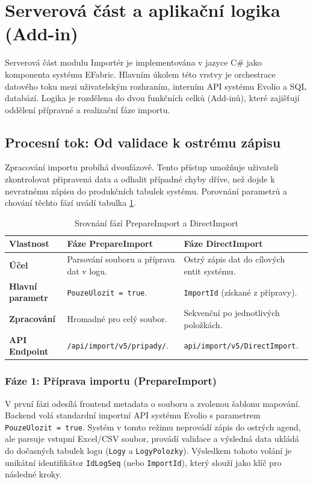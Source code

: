 \section{Serverová část a aplikační logika (Add-in)}

Serverová část modulu Importér je implementována v jazyce C\# jako komponenta systému EFabric. Hlavním úkolem této vrstvy je orchestrace datového toku mezi uživatelským rozhraním, interním API systému Evolio a SQL databází. Logika je rozdělena do dvou funkčních celků (Add-inů), které zajišťují oddělení přípravné a realizační fáze importu.

\subsection{Procesní tok: Od validace k ostrému zápisu}

Zpracování importu probíhá dvoufázově. Tento přístup umožňuje uživateli zkontrolovat připravená data a odhalit případné chyby dříve, než dojde k nevratnému zápisu do produkčních tabulek systému. Porovnání parametrů a chování těchto fází uvádí tabulka \ref{tab:be_comparison}.

\begin{table}[H]
\centering
\caption{Srovnání fází PrepareImport a DirectImport}
\label{tab:be_comparison}
\begin{tabular}{|l|p{5.5cm}|p{5.5cm}|}
\hline
\textbf{Vlastnost} & \textbf{Fáze PrepareImport} & \textbf{Fáze DirectImport} \\ \hline
\textbf{Účel} & Parsování souboru a příprava dat v logu. & Ostrý zápis dat do cílových entit systému. \\ \hline
\textbf{Hlavní parametr} & \texttt{PouzeUlozit = true}. & \texttt{ImportId} (získané z přípravy). \\ \hline
\textbf{Zpracování} & Hromadné pro celý soubor. & Sekvenční po jednotlivých položkách. \\ \hline
\textbf{API Endpoint} & \texttt{/api/import/v5/pripady/}. & \texttt{api/import/v5/DirectImport}. \\ \hline
\end{tabular}
\end{table}

\subsubsection{Fáze 1: Příprava importu (PrepareImport)}
V první fázi odesílá frontend metadata o souboru a zvolenou šablonu mapování. Backend volá standardní importní API systému Evolio s parametrem \texttt{PouzeUlozit = true}. Systém v tomto režimu neprovádí zápis do ostrých agend, ale parsuje vstupní Excel/CSV soubor, provádí validace a výsledná data ukládá do dočasných tabulek logu (\texttt{Logy} a \texttt{LogyPolozky}). Výsledkem tohoto volání je unikátní identifikátor \texttt{IdLogSeq} (nebo \texttt{ImportId}), který slouží jako klíč pro následné kroky.

